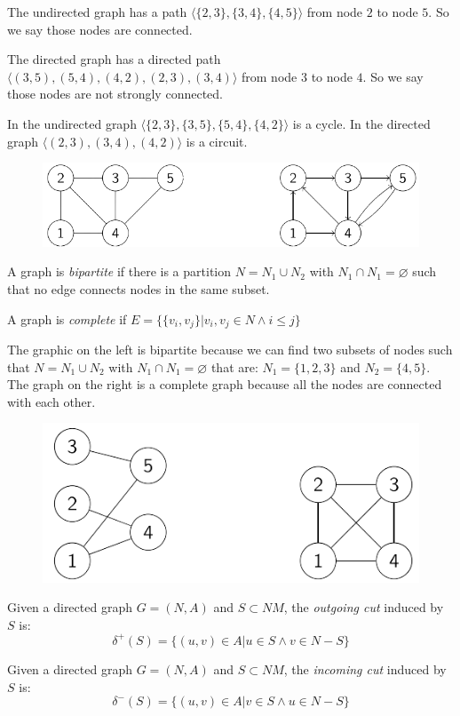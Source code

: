 \documentclass[12pt, a4paper]{report}
\begin{document}
    \begin{example}
        The undirected graph has a path $\langle \{2,3\},\{3,4\},\{4,5\}\rangle$ from node $2$ to node $5$. So we say those nodes are connected. 
        
        The directed graph has a directed path $\langle (3,5),(5,4),(4,2),(2,3),(3,4) \rangle$ from node $3$ to node $4$. So we say those nodes are not strongly connected. 
        
        In the undirected graph $\langle \{2,3\},\{3,5\},\{5,4\},\{4,2\}\rangle$ is a cycle. 
        In the directed graph $\langle (2,3),(3,4),(4,2) \rangle$ is a circuit. 
        \begin{figure}[H]
            \centering
            \includegraphics[width=0.75\linewidth]{images/graph.png}
        \end{figure}
    \end{example}
    \begin{definition}
        A graph is \emph{bipartite} if there is a partition $N=N_1 \cup N_2$ with $N_1 \cap N_1 = \varnothing$ such that no edge connects nodes in the same subset. 

        A graph is \emph{complete} if $E=\{ \{v_i,v_j\} | v_i,v_j \in N \land i \leq j \}$
    \end{definition}
    \begin{example}
        The graphic on the left is bipartite because we can find two subsets of nodes such that $N=N_1 \cup N_2$ with $N_1 \cap N_1 = \varnothing$ that are: $N_1=\{1,2,3\}$ and 
        $N_2=\{4,5\}$. The graph on the right is a complete graph because all the nodes are connected with each other. 
        \begin{figure}[H]
            \centering
            \includegraphics[width=0.5\linewidth]{images/bipcomp.png}
        \end{figure}
    \end{example}
    \begin{definition}
        Given a directed graph $G=(N,A)$ and $S \subset NM$, the \emph{outgoing cut} induced by $S$ is:
        \[ \delta^{+}(S)=\{(u,v) \in A | u \in S \land v \in N-S \} \]

        Given a directed graph $G=(N,A)$ and $S \subset NM$, the \emph{incoming cut} induced by $S$ is:
        \[ \delta^{-}(S)=\{(u,v) \in A | v \in S \land u \in N-S \} \]
    \end{definition}
\end{document}
